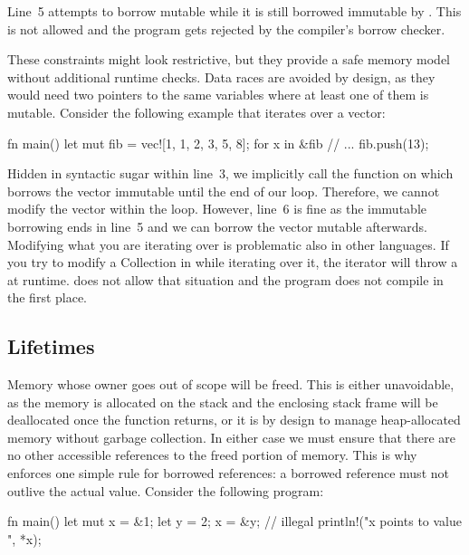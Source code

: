 Line~5 attempts to borrow  mutable while it is still borrowed immutable by .
This is not allowed and the program gets rejected by the compiler's borrow checker.

These constraints might look restrictive, but they provide a safe memory model without additional runtime checks.
Data races are avoided by design, as they would need two pointers to the same variables where at least one of them is mutable.
Consider the following example that iterates over a vector:

\begin{rustcode}
fn main() {
	let mut fib = vec![1, 1, 2, 3, 5, 8];
	for x in &fib {
		// ...
	}
	fib.push(13);
}
\end{rustcode}

Hidden in syntactic sugar within line~3, we implicitly call the  function on  which borrows the vector immutable until the end of our loop.
Therefore, we cannot modify the vector within the loop.
However, line~6 is fine as the immutable borrowing ends in line~5 and we can borrow the vector mutable afterwards.
Modifying what you are iterating over is problematic also in other languages.
If you try to modify a Collection in \java while iterating over it, the iterator will throw a  at runtime.
\rust does not allow that situation and the program does not compile in the first place.


\subsection{Lifetimes}

Memory whose owner goes out of scope will be freed.
This is either unavoidable, as the memory is allocated on the stack and the enclosing stack frame will be deallocated once the function returns, or it is by design to manage heap-allocated memory without garbage collection.
In either case we must ensure that there are no other accessible references to the freed portion of memory.
This is why \rust enforces one simple rule for borrowed references: a borrowed reference must not outlive the actual value.
Consider the following program:

\begin{rustcode}
fn main() {
	let mut x = &1;
	{
		let y = 2;
		x = &y; // illegal
	}
	println!("x points to value {}", *x);
}
\end{rustcode}

